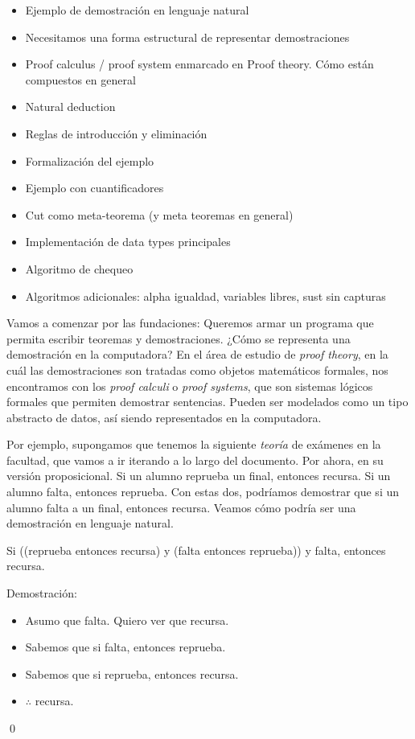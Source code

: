 \newcommand{\reprueba}{X}
\newcommand{\recursa}{R}
\newcommand{\falta}{F}

\newcommand{\proofSpacing}{\vspace*{0.2cm}}

\begin{itemize}
    \item Ejemplo de demostración en lenguaje natural \ok
    \item Necesitamos una forma estructural de representar demostraciones \ok
    \item Proof calculus / proof system enmarcado en Proof theory. Cómo están
    compuestos en general \ok
    \item Natural deduction \ok
    \item Reglas de introducción y eliminación \ok
    \item Formalización del ejemplo \ok
    \item Ejemplo con cuantificadores
    \item Cut como meta-teorema (y meta teoremas en general)
    \item Implementación de data types principales \ok
    \item Algoritmo de chequeo 
    \item Algoritmos adicionales: alpha igualdad, variables libres, sust sin capturas \ok
\end{itemize}

Vamos a comenzar por las fundaciones: Queremos armar un programa que permita
escribir teoremas y demostraciones. ¿Cómo se representa una demostración en la
computadora? En el área de estudio de \textit{proof theory}, en la cuál las
demostraciones son tratadas como objetos matemáticos formales, nos encontramos
con los \textit{proof calculi} o \textit{proof systems}, que son sistemas
lógicos formales que permiten demostrar sentencias. Pueden ser modelados como un
tipo abstracto de datos, así siendo representados en la computadora.

Por ejemplo, supongamos que tenemos la siguiente \textit{teoría} de exámenes en
la facultad, que vamos a ir iterando a lo largo del documento. Por ahora, en su
versión proposicional. Si un alumno reprueba un final, entonces recursa. Si un
alumno falta, entonces reprueba. Con estas dos, podríamos demostrar que si un
alumno falta a un final, entonces recursa. Veamos cómo podría ser una
demostración en lenguaje natural.

\begin{ejemplo}\label{nd:ex:exam}
    Si ((reprueba entonces recursa) y (falta entonces reprueba)) y falta, entonces recursa.

    Demostración:
\begin{itemize}
    \item Asumo que falta. Quiero ver que recursa.
    \item Sabemos que si falta, entonces reprueba.
    \item Sabemos que si reprueba, entonces recursa.
    \item $\therefore$ recursa.
\end{itemize}
    \qed
\end{ejemplo}

